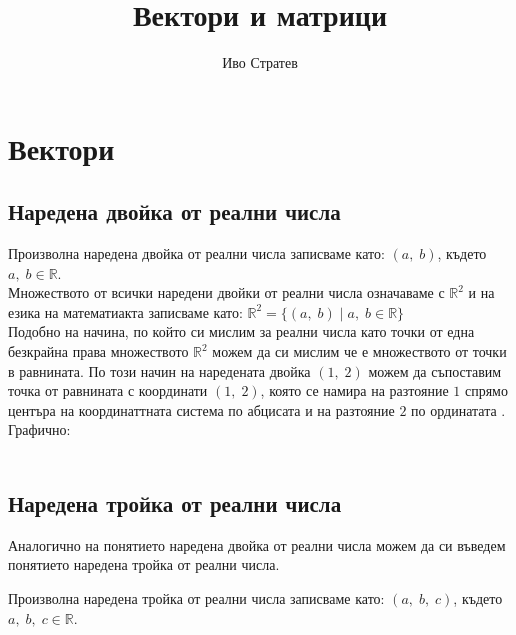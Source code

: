 \documentclass[12pt]{article}
\title{Вектори и матрици}
\author{Иво Стратев}
\newcommand{\R}{\mathbb{R}}
\begin{document}
\maketitle

\section*{Вектори}

\subsection*{Наредена двойка от реални числа}

Произволна наредена двойка от реални числа записваме като: $(a, \; b)$, където $a, \; b \in \R$. \\

Множеството от всички наредени двойки от реални числа означаваме с $\R^2$ и на езика на математиакта записваме като:
$\R^2 = \{(a, \; b) \; | \; a, \; b \in \R\}$ \\

Подобно на начина, по който си мислим за реални числа като точки от една безкрайна права множеството $\R^2$ можем
да си мислим че е множеството от точки в равнината. По този начин на наредената двойка $(1, \; 2)$ можем да съпоставим
точка от равнината с координати $(1, \; 2)$, която се намира на разтояние $1$ спрямо центъра на координаттната система
по абцисата и на разтояние $2$ по ординатата . Графично: \\\\


\subsection*{Наредена тройка от реални числа}
  
Аналогично на понятието наредена двойка от реални числа можем да си въведем понятието наредена тройка от реални числа.

Произволна наредена тройка от реални числа записваме като: $(a, \; b, \; c)$, където $a, \; b, \; c \in \R$. \\
  
\end{document}
